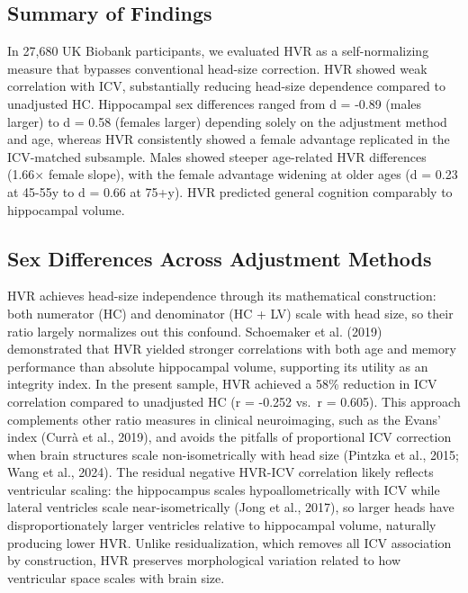 \documentclass[
]{article}
\begin{document}
\subsection{Summary of Findings}\label{summary-of-findings}

In 27,680 UK Biobank participants, we evaluated HVR as a
self-normalizing measure that bypasses conventional head-size
correction. HVR showed weak correlation with ICV, substantially reducing
head-size dependence compared to unadjusted HC. Hippocampal sex
differences ranged from d = -0.89 (males larger) to d = 0.58 (females
larger) depending solely on the adjustment method and age, whereas HVR
consistently showed a female advantage replicated in the ICV-matched
subsample. Males showed steeper age-related HVR differences (1.66×
female slope), with the female advantage widening at older ages (d =
0.23 at 45-55y to d = 0.66 at 75+y). HVR predicted general cognition
comparably to hippocampal volume.

\subsection{Sex Differences Across Adjustment
Methods}\label{sex-differences-across-adjustment-methods-1}

HVR achieves head-size independence through its mathematical
construction: both numerator (HC) and denominator (HC + LV) scale with
head size, so their ratio largely normalizes out this confound.
Schoemaker et al. (2019) demonstrated that HVR yielded stronger
correlations with both age and memory performance than absolute
hippocampal volume, supporting its utility as an integrity index. In the
present sample, HVR achieved a 58\% reduction in ICV correlation
compared to unadjusted HC (r = -0.252 vs.~r = 0.605). This approach
complements other ratio measures in clinical neuroimaging, such as the
Evans' index (Currà et al., 2019), and avoids the pitfalls of
proportional ICV correction when brain structures scale
non-isometrically with head size (Pintzka et al., 2015; Wang et al.,
2024). The residual negative HVR-ICV correlation likely reflects
ventricular scaling: the hippocampus scales hypoallometrically with ICV
while lateral ventricles scale near-isometrically (Jong et al., 2017),
so larger heads have disproportionately larger ventricles relative to
hippocampal volume, naturally producing lower HVR. Unlike
residualization, which removes all ICV association by construction, HVR
preserves morphological variation related to how ventricular space
scales with brain size.
\end{document}
